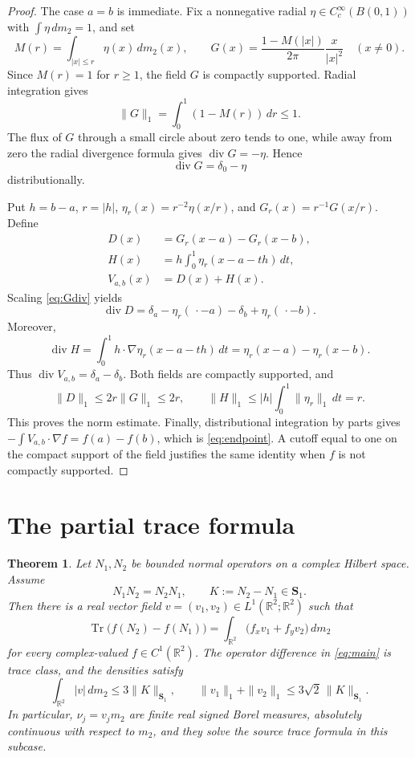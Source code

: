 \documentclass[11pt]{article}
\newtheorem{theorem}{Theorem}
\newcommand{\R}{\mathbb R}
\newcommand{\Sone}{\boldsymbol S_1}
\newcommand{\Tr}{\operatorname{Tr}}
\newcommand{\diver}{\operatorname{div}}
\begin{document}
\begin{proof}
The case \(a=b\) is immediate.  Fix a nonnegative radial
\(\eta\in C_c^\infty(B(0,1))\) with \(\int\eta\,dm_2=1\), and set
\[
 M(r)=\int_{|x|\leq r}\eta(x)\,dm_2(x),
 \qquad
 G(x)=\frac{1-M(|x|)}{2\pi}\frac{x}{|x|^2}\quad(x\ne0).
\]
Since \(M(r)=1\) for \(r\geq1\), the field \(G\) is compactly supported.
Radial integration gives
\[
 \|G\|_1=\int_0^1(1-M(r))\,dr\leq1.
\]
The flux of \(G\) through a small circle about zero tends to one, while away
from zero the radial divergence formula gives \(\diver G=-\eta\).  Hence
\begin{equation}\label{eq:Gdiv}
 \diver G=\delta_0-\eta
\end{equation}
distributionally.

Put \(h=b-a\), \(r=|h|\),
\(\eta_r(x)=r^{-2}\eta(x/r)\), and \(G_r(x)=r^{-1}G(x/r)\).  Define
\begin{align*}
 D(x)&=G_r(x-a)-G_r(x-b),\\
 H(x)&=h\int_0^1\eta_r(x-a-th)\,dt,\\
 V_{a,b}(x)&=D(x)+H(x).
\end{align*}
Scaling \eqref{eq:Gdiv} yields
\[
 \diver D=\delta_a-\eta_r(\,\cdot-a)-\delta_b+\eta_r(\,\cdot-b).
\]
Moreover,
\[
 \diver H
 =\int_0^1 h\mathbin{\cdot}\nabla\eta_r(x-a-th)\,dt
 =\eta_r(x-a)-\eta_r(x-b).
\]
Thus \(\diver V_{a,b}=\delta_a-\delta_b\).  Both fields are compactly
supported, and
\[
 \|D\|_1\leq2r\|G\|_1\leq2r,
 \qquad
 \|H\|_1\leq |h|\int_0^1\|\eta_r\|_1\,dt=r.
\]
This proves the norm estimate.  Finally, distributional integration by parts
gives
\(-\int V_{a,b}\cdot\nabla f=f(a)-f(b)\), which is
\eqref{eq:endpoint}.  A cutoff equal to one on the compact support of the
field justifies the same identity when \(f\) is not compactly supported.
\end{proof}

\section{The partial trace formula}

\begin{theorem}\label{thm:main}
Let \(N_1,N_2\) be bounded normal operators on a complex Hilbert space.
Assume
\[
 N_1N_2=N_2N_1,
 \qquad K:=N_2-N_1\in\Sone.
\]
Then there is a real vector field \(v=(v_1,v_2)\in
L^1(\R^2;\R^2)\) such that
\begin{equation}\label{eq:main}
 \Tr\bigl(f(N_2)-f(N_1)\bigr)
 =\int_{\R^2}\bigl(f_xv_1+f_yv_2\bigr)\,dm_2
\end{equation}
for every complex-valued \(f\in C^1(\R^2)\).  The operator difference in
\eqref{eq:main} is trace class, and the densities satisfy
\begin{equation}\label{eq:norms}
 \int_{\R^2}|v|\,dm_2\leq3\|K\|_{\Sone},
 \qquad
 \|v_1\|_1+\|v_2\|_1
 \leq3\sqrt2\,\|K\|_{\Sone}.
\end{equation}
In particular, \(\nu_j=v_jm_2\) are finite real signed Borel measures,
absolutely continuous with respect to \(m_2\), and they solve the source trace
formula in this subcase.
\end{theorem}
\end{document}
